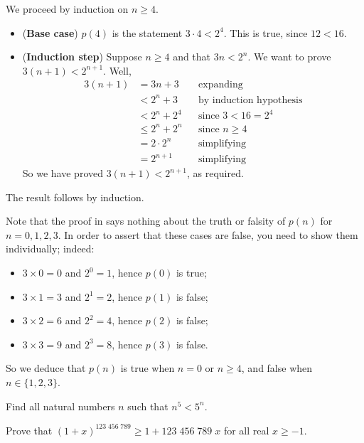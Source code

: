 \begin{cproof}
We proceed by induction on $n \ge 4$.
\begin{itemize}
\item (\textbf{Base case}) $p(4)$ is the statement $3 \cdot 4 < 2^4$. This is true, since $12 < 16$.

\item (\textbf{Induction step}) Suppose $n \ge 4$ and that $3n < 2^n$. We want to prove $3(n+1) < 2^{n+1}$. Well,
\begin{align*}
3(n+1) &= 3n+3 && \text{expanding} \\
&< 2^n + 3   && \text{by induction hypothesis} \\
&< 2^n + 2^4 && \text{since $3 < 16 = 2^4$} \\
&\le 2^n + 2^n && \text{since $n \ge 4$} \\
&= 2 \cdot 2^n && \text{simplifying} \\
&= 2^{n+1} && \text{simplifying}
\end{align*}
So we have proved $3(n+1) < 2^{n+1}$, as required.
\end{itemize}
The result follows by induction.
\end{cproof}

Note that the proof in  says nothing about the truth or falsity of $p(n)$ for $n=0,1,2,3$. In order to assert that these cases are false, you need to show them individually; indeed:
\begin{itemize}
\item $3 \times 0 = 0$ and $2^0 = 1$, hence $p(0)$ is true;
\item $3 \times 1 = 3$ and $2^1 = 2$, hence $p(1)$ is false;
\item $3 \times 2 = 6$ and $2^2 = 4$, hence $p(2)$ is false;
\item $3 \times 3 = 9$ and $2^3 = 8$, hence $p(3)$ is false.
\end{itemize}
So we deduce that $p(n)$ is true when $n=0$ or $n \ge 4$, and false when $n \in \{ 1, 2, 3 \}$.

\begin{exercise}
\label{exNPowerFiveLessThanFivePowerN}
Find all natural numbers $n$ such that $n^5 < 5^n$.
\end{exercise}

\begin{exercise}
Prove that $(1+x)^{123\;456\;789} \ge 1 + 123\;456\;789\;x$ for all real $x \ge -1$.
\end{exercise}

